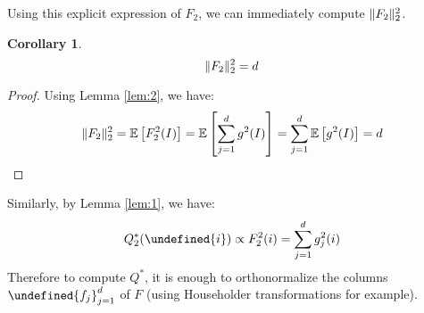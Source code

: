 \documentclass{article}
\theoremstyle{plain}
\newtheorem{corollary}[lemma]{Corollary}
\theoremstyle{definition}
\theoremstyle{remark}
\let\brace\undefined
\DeclarePairedDelimiter{\brace}{\lbrace}{\rbrace}
\DeclarePairedDelimiter{\norm}{\lVert}{\rVert}
\newcommand{\E}[1]{\mathbb{E}\left[#1\right]}
\begin{document}
Using this explicit expression of $F_2$, we can immediately compute $\norm{F_2}_2^2$.
\begin{corollary}
    \begin{equation*}
        \norm{F_2}_2^2 = d
    \end{equation*}
\end{corollary}
\begin{proof}
    Using Lemma \ref{lem:2}, we have:
    \begin{equation*}
        \norm{F_2}_2^2 = \E{F_2^2(I)} = \E{\sum_{j=1}^{d}g^2(I)} = \sum_{j=1}^{d} \E{g^2(I)} = d
    \end{equation*}
\end{proof}

Similarly, by Lemma \ref{lem:1}, we have:
\begin{equation*}
    Q^{*}_2(\brace{i}) \propto F^2_2(i) = \sum_{j=1}^{d} g^2_j(i)
\end{equation*}
Therefore to compute $Q^{*}$, it is enough to orthonormalize the columns $\brace{f_j}_{j=1}^{d}$ of $F$ (using Householder transformations for example).
\end{document}
